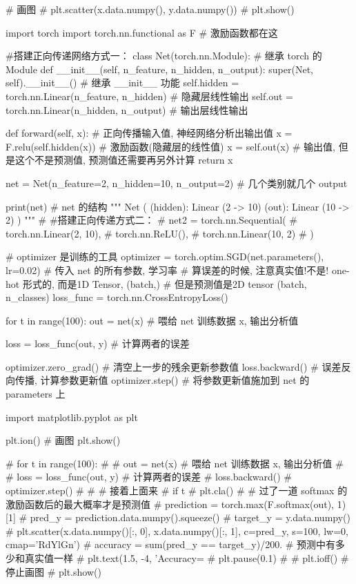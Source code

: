 \documentclass{article}
\begin{document}
\begin{python}
\begin{python}
			# 画图
			# plt.scatter(x.data.numpy(), y.data.numpy())
			# plt.show()
			
			import torch
			import torch.nn.functional as F     # 激励函数都在这
			
			#搭建正向传递网络方式一：
			class Net(torch.nn.Module):     # 继承 torch 的 Module
			def __init__(self, n_feature, n_hidden, n_output):
			super(Net, self).__init__()     # 继承 __init__ 功能
			self.hidden = torch.nn.Linear(n_feature, n_hidden)   # 隐藏层线性输出
			self.out = torch.nn.Linear(n_hidden, n_output)       # 输出层线性输出
			
			def forward(self, x):
			# 正向传播输入值, 神经网络分析出输出值
			x = F.relu(self.hidden(x))      # 激励函数(隐藏层的线性值)
			x = self.out(x)                 # 输出值, 但是这个不是预测值, 预测值还需要再另外计算
			return x
			
			net = Net(n_feature=2, n_hidden=10, n_output=2) # 几个类别就几个 output
			
			print(net)  # net 的结构
			"""
			Net (
			(hidden): Linear (2 -> 10)
			(out): Linear (10 -> 2)
			)
			"""
			# #搭建正向传递方式二：
			# net2 = torch.nn.Sequential(
			#     torch.nn.Linear(2, 10),
			#     torch.nn.ReLU(),
			#     torch.nn.Linear(10, 2)
			# )
			
			
			# optimizer 是训练的工具
			optimizer = torch.optim.SGD(net.parameters(), lr=0.02)  # 传入 net 的所有参数, 学习率
			# 算误差的时候, 注意真实值!不是! one-hot 形式的, 而是1D Tensor, (batch,)
			# 但是预测值是2D tensor (batch, n_classes)
			loss_func = torch.nn.CrossEntropyLoss()
			
			for t in range(100):
			out = net(x)     # 喂给 net 训练数据 x, 输出分析值
			
			loss = loss_func(out, y)     # 计算两者的误差
			
			optimizer.zero_grad()   # 清空上一步的残余更新参数值
			loss.backward()         # 误差反向传播, 计算参数更新值
			optimizer.step()        # 将参数更新值施加到 net 的 parameters 上
			
			
			
			
			import matplotlib.pyplot as plt
			
			plt.ion()   # 画图
			plt.show()
			
			# for t in range(100):
			#
			#     out = net(x)  # 喂给 net 训练数据 x, 输出分析值
			#
			#     loss = loss_func(out, y)  # 计算两者的误差
			#     loss.backward()
			#     optimizer.step()
			#
			#     # 接着上面来
			#     if t %
			#         plt.cla()
			#         # 过了一道 softmax 的激励函数后的最大概率才是预测值
			#         prediction = torch.max(F.softmax(out), 1)[1]
			#         pred_y = prediction.data.numpy().squeeze()
			#         target_y = y.data.numpy()
			#         plt.scatter(x.data.numpy()[:, 0], x.data.numpy()[:, 1], c=pred_y, s=100, lw=0, cmap='RdYlGn')
			#         accuracy = sum(pred_y == target_y)/200.  # 预测中有多少和真实值一样
			#         plt.text(1.5, -4, 'Accuracy=%
			#         plt.pause(0.1)
			#
			# plt.ioff()  # 停止画图
			# plt.show()
		\end{python}
	

\end{python}
\end{document}
